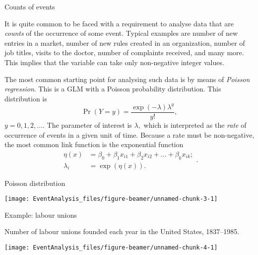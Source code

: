 \documentclass[10pt,ignorenonframetext,]{beamer}
\begin{document}
\begin{frame}{Counts of events}

It is quite common to be faced with a requirement to analyse data that
are \emph{counts} of the occurrence of some event. Typical examples are
number of new entries in a market, number of new rules created in an
organization, number of job titles, visits to the doctor, number of
complaints received, and many more. This implies that the variable can
take only non-negative integer values.

The most common starting point for analysing such data is by means of
\emph{Poisson regression}. This is a GLM with a Poisson probability
distribution. This distribution is \[
\Pr(Y = y) = \frac{\exp(-\lambda) \lambda^y}{y!},
\] \(y = 0, 1, 2, \dots.\) The parameter of interest is \(\lambda,\)
which is interpreted as the \emph{rate} of occurrence of events in a
given unit of time. Because a rate must be non-negative, the most common
link function is the exponential function \[
\begin{aligned}
\eta(x) &= \beta_0 + \beta_1 x_{i1} + \beta_2 x_{i2} + \dots + \beta_k x_{ik}; \\
\lambda_i &= \exp(\eta(x)).
\end{aligned}.
\]

\end{frame}

\begin{frame}{Poisson distribution}

\begin{center}\texttt{[image: EventAnalysis\_files/figure-beamer/unnamed-chunk-3-1]} \end{center}

\end{frame}

\begin{frame}{Example: labour unions}

Number of labour unions founded each year in the United States,
1837--1985.

\begin{center}\texttt{[image: EventAnalysis\_files/figure-beamer/unnamed-chunk-4-1]} \end{center}

\end{frame}
\end{document}
